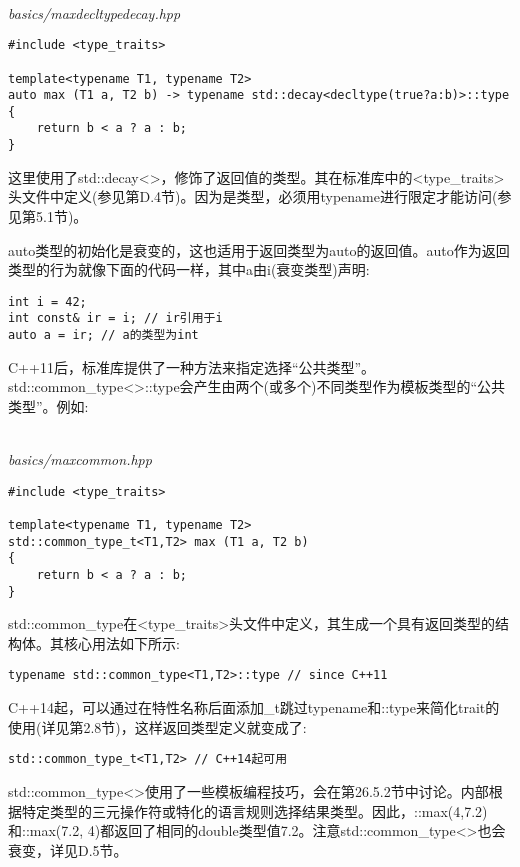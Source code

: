 \hspace*{\fill} \\ %
\noindent
\textit{basics/maxdecltypedecay.hpp}
\begin{lstlisting}[style=styleCXX]
#include <type_traits>

template<typename T1, typename T2>
auto max (T1 a, T2 b) -> typename std::decay<decltype(true?a:b)>::type
{
	return b < a ? a : b;
}
\end{lstlisting}

这里使用了std::decay<>，修饰了返回值的类型。其在标准库中的<type\_traits>头文件中定义(参见第D.4节)。因为是类型，必须用typename进行限定才能访问(参见第5.1节)。

auto类型的初始化是衰变的，这也适用于返回类型为auto的返回值。auto作为返回类型的行为就像下面的代码一样，其中a由i(衰变类型)声明:

\begin{lstlisting}[style=styleCXX]
int i = 42;
int const& ir = i; // ir引用于i
auto a = ir; // a的类型为int
\end{lstlisting}


C++11后，标准库提供了一种方法来指定选择“公共类型”。std::common\_type<>::type会产生由两个(或多个)不同类型作为模板类型的“公共类型”。例如:

\hspace*{\fill} \\ %
\noindent
\textit{basics/maxcommon.hpp}
\begin{lstlisting}[style=styleCXX]
#include <type_traits>

template<typename T1, typename T2>
std::common_type_t<T1,T2> max (T1 a, T2 b)
{
	return b < a ? a : b;
}
\end{lstlisting}

std::common\_type在<type\_traits>头文件中定义，其生成一个具有返回类型的结构体。其核心用法如下所示:

\begin{lstlisting}[style=styleCXX]
typename std::common_type<T1,T2>::type // since C++11
\end{lstlisting}

C++14起，可以通过在特性名称后面添加\_t跳过typename和::type来简化trait的使用(详见第2.8节)，这样返回类型定义就变成了:

\begin{lstlisting}[style=styleCXX]
std::common_type_t<T1,T2> // C++14起可用
\end{lstlisting}

std::common\_type<>使用了一些模板编程技巧，会在第26.5.2节中讨论。内部根据特定类型的三元操作符或特化的语言规则选择结果类型。因此，::max(4,7.2)和::max(7.2, 4)都返回了相同的double类型值7.2。注意std::common\_type<>也会衰变，详见D.5节。




